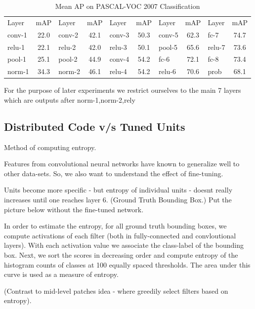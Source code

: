 \documentclass[runningheads]{llncs}
\begin{document}
\setlength{\tabcolsep}{4pt}
\begin{table}
\begin{center}
\caption{Mean AP on PASCAL-VOC 2007 Classification}
\label{table:headings}
\begin{tabular}{lc|lc|lc|lc|lc}
\hline\noalign{\smallskip}
Layer & mAP & Layer & mAP & Layer & mAP & Layer & mAP & Layer & mAP \\
\noalign{\smallskip}
\hline
\noalign{\smallskip}
conv-1 & 22.0 & conv-2 & 42.1 & conv-3 & 50.3 & conv-5 & 62.3 & fc-7 & 74.7 \\
relu-1 & 22.1 & relu-2 & 42.0 & relu-3 & 50.1 & pool-5 & 65.6  & relu-7 & 73.6 \\ 
pool-1 & 25.1 & pool-2 & 44.9 & conv-4 & 54.2 & fc-6   & 72.1  & fc-8 & 73.4 \\
norm-1 & 34.3 & norm-2 & 46.1 & relu-4 & 54.2 & relu-6 & 70.6 & prob & 68.1 \\ 
\hline
\end{tabular}
\end{center}
\end{table}
\setlength{\tabcolsep}{1.4pt}

For the purpose of later experiments we restrict ourselves to the main 7 layers which are outputs after norm-1,norm-2,rely 

\subsection{Distributed Code v/s Tuned Units}
Method of computing entropy. 

Features from convolutional neural networks have known to generalize well to other data-sets. So, we  also want to understand the effect of fine-tuning.  

Units become more specific - but entropy of individual units - doesnt really increases until one reaches layer 6. (Ground Truth Bounding Box.) Put the picture below without the fine-tuned network.


In order to estimate the entropy, for all ground truth bounding boxes, we compute activations of each filter (both in fully-connected and convloutional layers). With each activation value we associate the class-label of the bounding box. Next, we sort the scores in decreasing order and compute entropy of the histogram counts of classes at 100 equally spaced thresholds. The area under this curve is used as a measure of entropy. 

(Contrast to mid-level patches idea - where greedily select filters based on entropy). 
\end{document}
